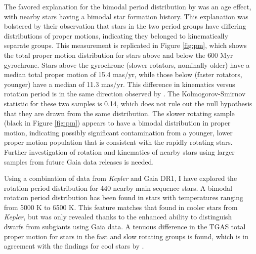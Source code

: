 \documentclass[manuscript, letterpaper]{aastex6}
\makeatletter
\let\origsection\section
\renewcommand\section{\@ifstar{\starsection}{\nostarsection}}
\newcommand\nostarsection[1]{\sectionprelude\origsection{#1}}
\newcommand\starsection[1]{\sectionprelude\origsection*{#1}}
\newcommand\sectionprelude{\vspace{1em}}
\newcommand{\Kepler}{\textsl{Kepler}\xspace}
\makeatother
\begin{document}
The favored explanation for the bimodal period distribution by \citet{mcquillan2013} was an age effect, with nearby stars having a bimodal star formation history. This explanation was bolstered by their observation that stars in the two period groups have differing distributions of proper motions, indicating they belonged to kinematically separate groups. This measurement is replicated in Figure \ref{fig:pm}, which shows the total proper motion distribution for stars above and below the 600 Myr gyrochrone. Stars above the gyrochrone (slower rotators, nominally older) have a median total proper motion of 15.4 mas/yr, while those below (faster rotators, younger)  have a median of 11.3 mas/yr. This difference in kinematics versus rotation period is in the same direction observed by \citet{mcquillan2013}. The Kolmogorov-Smirnov statistic for these two samples is 0.14, which does not rule out the null hypothesis that they are drawn from the same distribution. The slower rotating sample (black in Figure \ref{fig:pm}) appears to have a bimodal distribution in proper motion, indicating possibly significant contamination from a younger, lower proper motion population that is consistent with the rapidly rotating stars.  Further investigation of rotation and kinematics of nearby stars using larger samples from future Gaia data releases is needed.



\section{Discussion}

Using a combination of data from \Kepler and Gaia DR1, I have explored the rotation period distribution for 440 nearby main sequence stars. A bimodal rotation period distribution has been found in stars with temperatures ranging from 5000 K to 6500 K. This feature matches that found in cooler stars from \Kepler, but was only revealed thanks to the enhanced ability to distinguish dwarfs from subgiants using Gaia data. 
A tenuous difference in the TGAS total proper motion for stars in the fast and slow rotating groups is found, which is in agreement with the findings for cool stars by \citet{mcquillan2013}.
\end{document}

